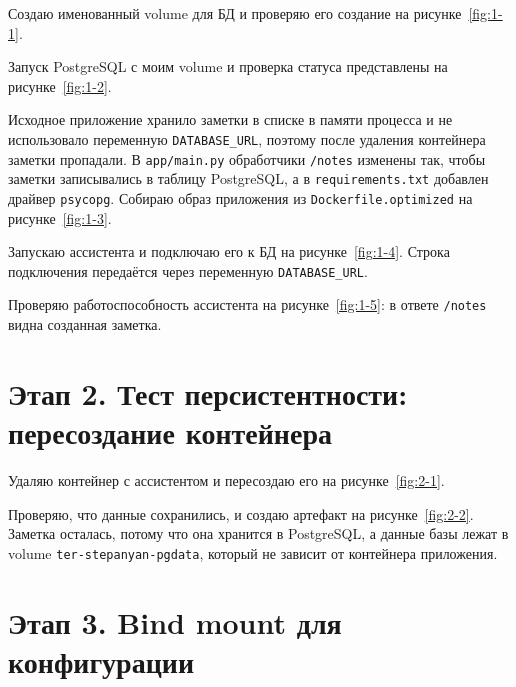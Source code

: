Создаю именованный volume для БД и проверяю его создание на
рисунке~\ref{fig:1-1}.


Запуск PostgreSQL с моим volume и проверка статуса представлены на
рисунке~\ref{fig:1-2}.


Исходное приложение хранило заметки в списке в памяти процесса и не
использовало переменную \texttt{DATABASE\_URL}, поэтому после удаления
контейнера заметки пропадали. В \texttt{app/main.py} обработчики
\texttt{/notes} изменены так, чтобы заметки записывались в таблицу
PostgreSQL, а в \texttt{requirements.txt} добавлен драйвер \texttt{psycopg}.
Собираю образ приложения из \texttt{Dockerfile.optimized} на
рисунке~\ref{fig:1-3}.


Запускаю ассистента и подключаю его к БД на рисунке~\ref{fig:1-4}.
Строка подключения передаётся через переменную \texttt{DATABASE\_URL}.


Проверяю работоспособность ассистента на рисунке~\ref{fig:1-5}: в ответе
\texttt{/notes} видна созданная заметка.


\section{Этап 2. Тест персистентности: пересоздание контейнера}

Удаляю контейнер с ассистентом и пересоздаю его на рисунке~\ref{fig:2-1}.


Проверяю, что данные сохранились, и создаю артефакт на
рисунке~\ref{fig:2-2}. Заметка осталась, потому что она хранится в
PostgreSQL, а данные базы лежат в volume \texttt{ter-stepanyan-pgdata},
который не зависит от контейнера приложения.


\section{Этап 3. Bind mount для конфигурации}

